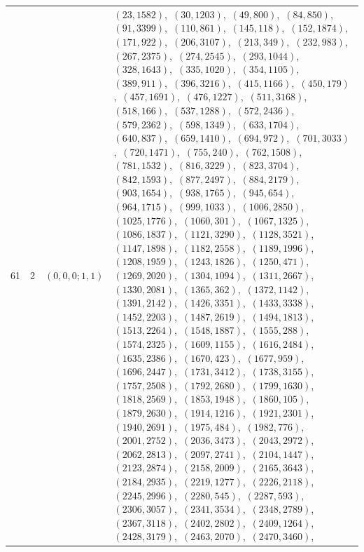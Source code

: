 \documentclass[11pt]{article}
\begin{document}
\begin{longtable}{@{}rrl>{\raggedright\arraybackslash}p{}@{}}
61 & 2 & $(0,0,0;1,1)$ & $(23,1582)$,\allowbreak\ $(30,1203)$,\allowbreak\ $(49,800)$,\allowbreak\ $(84,850)$,\allowbreak\ $(91,3399)$,\allowbreak\ $(110,861)$,\allowbreak\ $(145,118)$,\allowbreak\ $(152,1874)$,\allowbreak\ $(171,922)$,\allowbreak\ $(206,3107)$,\allowbreak\ $(213,349)$,\allowbreak\ $(232,983)$,\allowbreak\ $(267,2375)$,\allowbreak\ $(274,2545)$,\allowbreak\ $(293,1044)$,\allowbreak\ $(328,1643)$,\allowbreak\ $(335,1020)$,\allowbreak\ $(354,1105)$,\allowbreak\ $(389,911)$,\allowbreak\ $(396,3216)$,\allowbreak\ $(415,1166)$,\allowbreak\ $(450,179)$,\allowbreak\ $(457,1691)$,\allowbreak\ $(476,1227)$,\allowbreak\ $(511,3168)$,\allowbreak\ $(518,166)$,\allowbreak\ $(537,1288)$,\allowbreak\ $(572,2436)$,\allowbreak\ $(579,2362)$,\allowbreak\ $(598,1349)$,\allowbreak\ $(633,1704)$,\allowbreak\ $(640,837)$,\allowbreak\ $(659,1410)$,\allowbreak\ $(694,972)$,\allowbreak\ $(701,3033)$,\allowbreak\ $(720,1471)$,\allowbreak\ $(755,240)$,\allowbreak\ $(762,1508)$,\allowbreak\ $(781,1532)$,\allowbreak\ $(816,3229)$,\allowbreak\ $(823,3704)$,\allowbreak\ $(842,1593)$,\allowbreak\ $(877,2497)$,\allowbreak\ $(884,2179)$,\allowbreak\ $(903,1654)$,\allowbreak\ $(938,1765)$,\allowbreak\ $(945,654)$,\allowbreak\ $(964,1715)$,\allowbreak\ $(999,1033)$,\allowbreak\ $(1006,2850)$,\allowbreak\ $(1025,1776)$,\allowbreak\ $(1060,301)$,\allowbreak\ $(1067,1325)$,\allowbreak\ $(1086,1837)$,\allowbreak\ $(1121,3290)$,\allowbreak\ $(1128,3521)$,\allowbreak\ $(1147,1898)$,\allowbreak\ $(1182,2558)$,\allowbreak\ $(1189,1996)$,\allowbreak\ $(1208,1959)$,\allowbreak\ $(1243,1826)$,\allowbreak\ $(1250,471)$,\allowbreak\ $(1269,2020)$,\allowbreak\ $(1304,1094)$,\allowbreak\ $(1311,2667)$,\allowbreak\ $(1330,2081)$,\allowbreak\ $(1365,362)$,\allowbreak\ $(1372,1142)$,\allowbreak\ $(1391,2142)$,\allowbreak\ $(1426,3351)$,\allowbreak\ $(1433,3338)$,\allowbreak\ $(1452,2203)$,\allowbreak\ $(1487,2619)$,\allowbreak\ $(1494,1813)$,\allowbreak\ $(1513,2264)$,\allowbreak\ $(1548,1887)$,\allowbreak\ $(1555,288)$,\allowbreak\ $(1574,2325)$,\allowbreak\ $(1609,1155)$,\allowbreak\ $(1616,2484)$,\allowbreak\ $(1635,2386)$,\allowbreak\ $(1670,423)$,\allowbreak\ $(1677,959)$,\allowbreak\ $(1696,2447)$,\allowbreak\ $(1731,3412)$,\allowbreak\ $(1738,3155)$,\allowbreak\ $(1757,2508)$,\allowbreak\ $(1792,2680)$,\allowbreak\ $(1799,1630)$,\allowbreak\ $(1818,2569)$,\allowbreak\ $(1853,1948)$,\allowbreak\ $(1860,105)$,\allowbreak\ $(1879,2630)$,\allowbreak\ $(1914,1216)$,\allowbreak\ $(1921,2301)$,\allowbreak\ $(1940,2691)$,\allowbreak\ $(1975,484)$,\allowbreak\ $(1982,776)$,\allowbreak\ $(2001,2752)$,\allowbreak\ $(2036,3473)$,\allowbreak\ $(2043,2972)$,\allowbreak\ $(2062,2813)$,\allowbreak\ $(2097,2741)$,\allowbreak\ $(2104,1447)$,\allowbreak\ $(2123,2874)$,\allowbreak\ $(2158,2009)$,\allowbreak\ $(2165,3643)$,\allowbreak\ $(2184,2935)$,\allowbreak\ $(2219,1277)$,\allowbreak\ $(2226,2118)$,\allowbreak\ $(2245,2996)$,\allowbreak\ $(2280,545)$,\allowbreak\ $(2287,593)$,\allowbreak\ $(2306,3057)$,\allowbreak\ $(2341,3534)$,\allowbreak\ $(2348,2789)$,\allowbreak\ $(2367,3118)$,\allowbreak\ $(2402,2802)$,\allowbreak\ $(2409,1264)$,\allowbreak\ $(2428,3179)$,\allowbreak\ $(2463,2070)$,\allowbreak\ $(2470,3460)$,\allowbreak\ 
\end{longtable}
\end{document}
